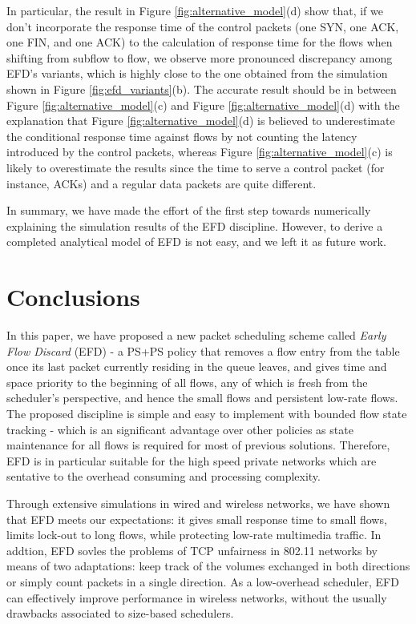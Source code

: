 \documentclass[preprint,12pt]{elsarticle}
\begin{document}
In particular, the result in Figure \ref{fig:alternative_model}(d) show that, if we don't incorporate the response time of the control packets (one SYN, one ACK, one FIN, and one ACK) to the calculation of response time for the flows when shifting from subflow to flow, we observe more pronounced discrepancy among EFD's variants, which is highly close to the one obtained from the simulation shown in Figure \ref{fig:efd_variants}(b). The accurate result should be in between Figure \ref{fig:alternative_model}(c) and Figure \ref{fig:alternative_model}(d) with the explanation that Figure \ref{fig:alternative_model}(d) is believed to underestimate the conditional response time against flows by not counting the latency introduced by the control packets, whereas Figure \ref{fig:alternative_model}(c) is likely to overestimate the results since the time to serve a control packet (for instance, ACKs) and a regular data packets are quite different.



In summary, we have made the effort of the first step towards numerically explaining the simulation results of the EFD discipline. However, to derive a completed analytical model of EFD is not easy, and we left it as future work. 


\section{Conclusions}
\label{sec:conclu}
In this paper, we have proposed a new packet scheduling scheme called \textit{Early Flow Discard} (EFD) - a PS+PS policy that removes a flow entry from the table once its last packet currently residing in the queue leaves, and gives time and space priority to the beginning of all flows, any of which is fresh from the scheduler's perspective, and hence the small flows and persistent low-rate flows. The proposed discipline is simple and easy to implement with bounded flow state tracking - which is an significant advantage over other policies as state maintenance for all flows is required for most of previous solutions. Therefore, EFD is in particular suitable for the high speed private networks which are sentative to the overhead consuming and processing complexity. 

Through extensive simulations in wired and wireless networks, we have shown that EFD meets our expectations: it gives small response time to small flows, limits lock-out to long flows, while protecting low-rate multimedia traffic. In addtion, EFD sovles the problems of TCP unfairness in 802.11 networks by means of two adaptations: keep track of the volumes exchanged in both directions or simply count packets in a single direction. As a low-overhead scheduler, EFD can effectively improve performance in wireless networks, without the usually drawbacks associated to size-based schedulers. 
\end{document}
